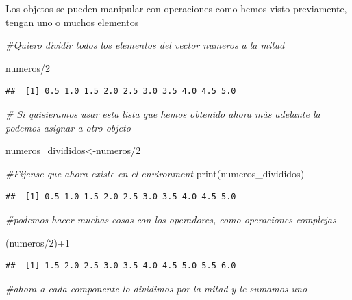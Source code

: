 \documentclass[
]{book}
\newenvironment{Shaded}{\begin{snugshade}}{\end{snugshade}}
\newcommand{\CommentTok}[1]{\textcolor[rgb]{0.56,0.35,0.01}{\textit{#1}}}
\newcommand{\DecValTok}[1]{\textcolor[rgb]{0.00,0.00,0.81}{#1}}
\newcommand{\FunctionTok}[1]{\textcolor[rgb]{0.00,0.00,0.00}{#1}}
\newcommand{\NormalTok}[1]{#1}
\newcommand{\OtherTok}[1]{\textcolor[rgb]{0.56,0.35,0.01}{#1}}
\newcommand{\SpecialCharTok}[1]{\textcolor[rgb]{0.00,0.00,0.00}{#1}}
\begin{document}
Los objetos se pueden manipular con operaciones como hemos visto previamente, tengan uno o muchos elementos

\begin{Shaded}
\begin{Highlighting}[]
\CommentTok{\#Quiero dividir todos los elementos del vector numeros a la mitad}

\NormalTok{numeros}\SpecialCharTok{/}\DecValTok{2}
\end{Highlighting}
\end{Shaded}

\begin{verbatim}
##  [1] 0.5 1.0 1.5 2.0 2.5 3.0 3.5 4.0 4.5 5.0
\end{verbatim}

\begin{Shaded}
\begin{Highlighting}[]
\CommentTok{\# Si quisieramos usar esta lista que hemos obtenido ahora màs adelante la podemos asignar a otro objeto}

\NormalTok{numeros\_divididos}\OtherTok{\textless{}{-}}\NormalTok{numeros}\SpecialCharTok{/}\DecValTok{2}

\CommentTok{\#Fijense que ahora existe en el environment}
\FunctionTok{print}\NormalTok{(numeros\_divididos)}
\end{Highlighting}
\end{Shaded}

\begin{verbatim}
##  [1] 0.5 1.0 1.5 2.0 2.5 3.0 3.5 4.0 4.5 5.0
\end{verbatim}

\begin{Shaded}
\begin{Highlighting}[]
\CommentTok{\#podemos hacer muchas cosas con los operadores, como operaciones complejas}

\NormalTok{(numeros}\SpecialCharTok{/}\DecValTok{2}\NormalTok{)}\SpecialCharTok{+}\DecValTok{1}
\end{Highlighting}
\end{Shaded}

\begin{verbatim}
##  [1] 1.5 2.0 2.5 3.0 3.5 4.0 4.5 5.0 5.5 6.0
\end{verbatim}

\begin{Shaded}
\begin{Highlighting}[]
\CommentTok{\#ahora a cada componente lo dividimos por la mitad y le sumamos uno}
\end{Highlighting}
\end{Shaded}
\end{document}
